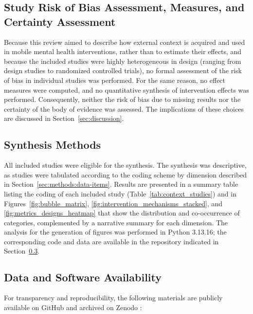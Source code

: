 \subsection{Study Risk of Bias Assessment, Measures, and Certainty Assessment}   
 
Because this review aimed to describe how external context is acquired and used in mobile mental health interventions, rather than to estimate their effects, and because the included studies were highly heterogeneous in design (ranging from design studies to randomized controlled trials), no formal assessment of the risk of bias in individual studies was performed. For the same reason, no effect measures were computed, and no quantitative synthesis of intervention effects was performed. Consequently, neither the risk of bias due to missing results nor the certainty of the body of evidence was assessed. The implications of these choices are discussed in Section~\ref{sec:discussion}.


\subsection{Synthesis Methods}   

All included studies were eligible for the synthesis. The synthesis was descriptive, as studies were tabulated according to the coding scheme by dimension described in Section~\ref{sec:methods:data-items}. Results are presented in a summary table listing the coding of each included study (Table~\ref{tab:context_studies}) and in Figures~\ref{fig:bubble_matrix}, \ref{fig:intervention_mechanisms_stacked}, and \ref{fig:metrics_designs_heatmap} that show the distribution and co-occurrence of categories, complemented by a narrative summary for each dimension. The analysis for the generation of figures was performed in Python 3.13.16; the corresponding code and data are available in the repository indicated in Section~\ref{sec:methods:dasa}.

\subsection{Data and Software Availability}
\label{sec:methods:dasa}

For transparency and reproducibility, the following materials are publicly available on GitHub
 and archived on Zenodo : 
